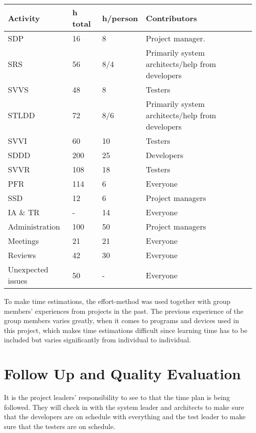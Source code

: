 \documentclass[a4paper]{article}
\begin{document}
\begin{center}
    \begin{tabular}{ | l | l | l | p{5cm} |}
    \hline
    \textbf{Activity} & \textbf{h total} & \textbf{h/person} & \textbf{Contributors} \\ \hline
    SDP & 16 & 8 & Project manager. \\ \hline
    SRS & 56 & 8/4 &  Primarily system architects/help from developers\\ \hline
    SVVS & 48 & 8 & Testers\\ \hline
    STLDD & 72 & 8/6 & Primarily system architects/help from developers\\ \hline
    SVVI & 60 & 10 & Testers\\ \hline
    SDDD & 200 & 25 & Developers\\ \hline
    SVVR & 108 & 18 & Testers\\ \hline
    PFR & 114 & 6 & Everyone\\ \hline
    SSD & 12 & 6 & Project managers\\ \hline
    IA \& TR & - & 14 & Everyone \\ \hline
    Administration & 100 & 50 & Project managers \\ \hline
    Meetings & 21 & 21 & Everyone \\ \hline
    Reviews & 42 & 30 & Everyone \\ \hline
    Unexpected issues & 50 & - & Everyone \\ \hline
    \end{tabular}
\end{center}

To make time estimations, the effort-method was used together with group members' experiences from projects in the past. The previous experience of the group members varies greatly, when it comes to programs and devices used in this project, which makes time estimations difficult since learning time has to be included but varies significantly from individual to individual.

\section{Follow Up and Quality Evaluation}

It is the project leaders' responsibility to see to that the time plan is being followed. They will check in with the system leader and architects to make sure that the developers are on schedule with everything and the test leader to make sure that the testers are on schedule.
\end{document}
